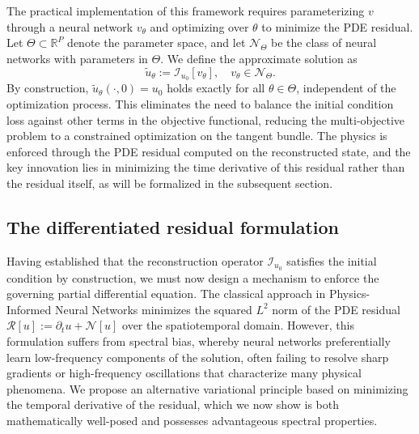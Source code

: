 \documentclass[11pt,reqno]{amsart}
\theoremstyle{plain}
\theoremstyle{definition}
\theoremstyle{remark}
\begin{document}
The practical implementation of this framework requires parameterizing $v$ through a neural network $v_\theta$ and optimizing over $\theta$ to minimize the PDE residual. Let $\Theta \subset \mathbb{R}^P$ denote the parameter space, and let $\mathcal{N}_{\Theta}$ be the class of neural networks with parameters in $\Theta$. We define the approximate solution as
\begin{equation} \label{eq:neural_reconstruction}
    \tilde{u}_\theta := \mathcal{I}_{u_0}[v_\theta], \quad v_\theta \in \mathcal{N}_{\Theta}.
\end{equation}
By construction, $\tilde{u}_\theta(\cdot, 0) = u_0$ holds exactly for all $\theta \in \Theta$, independent of the optimization process. This eliminates the need to balance the initial condition loss against other terms in the objective functional, reducing the multi-objective problem to a constrained optimization on the tangent bundle. The physics is enforced through the PDE residual computed on the reconstructed state, and the key innovation lies in minimizing the time derivative of this residual rather than the residual itself, as will be formalized in the subsequent section.


\subsection{The differentiated residual formulation}

Having established that the reconstruction operator $\mathcal{I}_{u_0}$ satisfies the initial condition by construction, we must now design a mechanism to enforce the governing partial differential equation. The classical approach in Physics-Informed Neural Networks minimizes the squared $L^2$ norm of the PDE residual $\mathcal{R}[u] := \partial_t u + \mathcal{N}[u]$ over the spatiotemporal domain. However, this formulation suffers from spectral bias, whereby neural networks preferentially learn low-frequency components of the solution, often failing to resolve sharp gradients or high-frequency oscillations that characterize many physical phenomena. We propose an alternative variational principle based on minimizing the temporal derivative of the residual, which we now show is both mathematically well-posed and possesses advantageous spectral properties.
\end{document}
